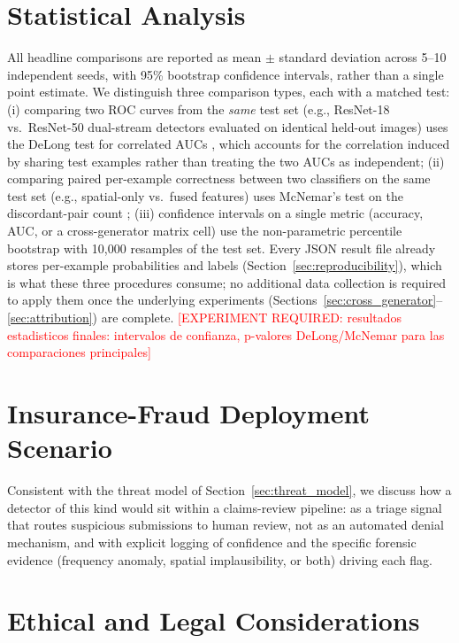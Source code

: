 \documentclass[journal]{IEEEtran}
\newcommand{\pending}[1]{\textcolor{red}{[EXPERIMENT REQUIRED: #1]}}
\begin{document}
\section{Statistical Analysis}
\label{sec:statistics}

All headline comparisons are reported as mean $\pm$ standard deviation across 5--10 independent seeds, with 95\% bootstrap confidence intervals, rather than a single point estimate. We distinguish three comparison types, each with a matched test: (i) comparing two ROC curves from the \emph{same} test set (e.g., ResNet-18 vs.\ ResNet-50 dual-stream detectors evaluated on identical held-out images) uses the DeLong test for correlated AUCs \cite{delong_1988}, which accounts for the correlation induced by sharing test examples rather than treating the two AUCs as independent; (ii) comparing paired per-example correctness between two classifiers on the same test set (e.g., spatial-only vs.\ fused features) uses McNemar's test on the discordant-pair count \cite{mcnemar_1947}; (iii) confidence intervals on a single metric (accuracy, AUC, or a cross-generator matrix cell) use the non-parametric percentile bootstrap \cite{bootstrap_efron1993} with 10{,}000 resamples of the test set. Every JSON result file already stores per-example probabilities and labels (Section~\ref{sec:reproducibility}), which is what these three procedures consume; no additional data collection is required to apply them once the underlying experiments (Sections~\ref{sec:cross_generator}--\ref{sec:attribution}) are complete. \pending{resultados estadisticos finales: intervalos de confianza, p-valores DeLong/McNemar para las comparaciones principales}

\section{Insurance-Fraud Deployment Scenario}
\label{sec:deployment}

Consistent with the threat model of Section~\ref{sec:threat_model}, we discuss how a detector of this kind would sit within a claims-review pipeline: as a triage signal that routes suspicious submissions to human review, not as an automated denial mechanism, and with explicit logging of confidence and the specific forensic evidence (frequency anomaly, spatial implausibility, or both) driving each flag.

\section{Ethical and Legal Considerations}
\label{sec:ethics}
\end{document}
